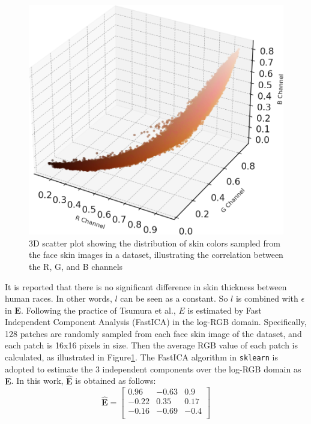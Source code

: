 \begin{spacing}{1.5}
\begin{figure}[t]
    \centering
    \includegraphics{Chapter3/original_data_rounded_plot.png}
    \caption{3D scatter plot showing the distribution of skin colors sampled from the face skin images in a dataset, illustrating the correlation between the R, G, and B channels}
    \label{fig:3dplot}
\end{figure}

It is reported that there is no significant difference in skin thickness between human races\cite{Whitmore2000}. In other words, $l$ can be seen as a constant. So $l$ is combined with $\epsilon$ in $\mathbf{E}$. Following the practice of Tsumura et al.\cite{tsumura1999independent}, $E$ is estimated by Fast Independent Component Analysis (FastICA)\cite{HYVARINEN2000411} in the log-RGB domain. Specifically, 128 patches are randomly sampled from each face skin image of the dataset, and each patch is 16x16 pixels in size. Then the average RGB value of each patch is calculated, as illustrated in Figure\ref{fig:3dplot}. The FastICA algorithm in \texttt{sklearn}\cite{scikit-learn} is adopted to estimate the 3 independent components over the log-RGB domain as $\mathbf{E}$. In this work, $\hat{\mathbf{E}}$ is obtained as follows:
\begin{equation}
    \hat{\mathbf{E}} = \begin{bmatrix}
        0.96  & -0.63 & 0.9  \\
        -0.22 & 0.35  & 0.17 \\
        -0.16 & -0.69 & -0.4 \\
    \end{bmatrix}
\end{equation}


\end{spacing}
